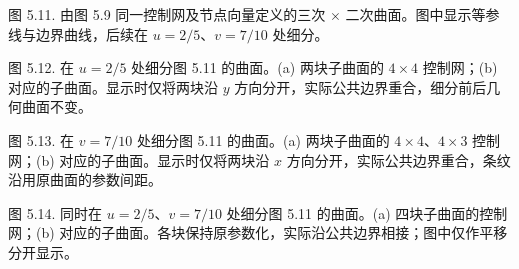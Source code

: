 \documentclass[../main.tex]{subfiles}
\begin{document}
\begin{center}
\begin{minipage}{18cm}
\vspace*{.6\baselineskip}
\centering
{}
\par\smallskip
图 5.11. 由图 5.9 同一控制网及节点向量定义的三次 \(\times\) 二次曲面。图中显示等参线与边界曲线，后续在 \(u=2/5\)、\(v=7/10\) 处细分。
\end{minipage}
\end{center}



\begin{center}
\begin{minipage}{24cm}
\vspace*{.6\baselineskip}
\centering
{}
\par\smallskip
图 5.12. 在 \(u=2/5\) 处细分图 5.11 的曲面。(a) 两块子曲面的 \(4\times4\) 控制网；(b) 对应的子曲面。显示时仅将两块沿 \(y\) 方向分开，实际公共边界重合，细分前后几何曲面不变。
\end{minipage}
\end{center}





\begin{center}
\begin{minipage}{24cm}
\vspace*{.6\baselineskip}
\centering
{}
\par\smallskip
图 5.13. 在 \(v=7/10\) 处细分图 5.11 的曲面。(a) 两块子曲面的 \(4\times4\)、\(4\times3\) 控制网；(b) 对应的子曲面。显示时仅将两块沿 \(x\) 方向分开，实际公共边界重合，条纹沿用原曲面的参数间距。
\end{minipage}
\end{center}



\begin{center}
\begin{minipage}{24.5cm}
\vspace*{.6\baselineskip}
\centering
\begin{minipage}{12cm}
\centering
{}
\end{minipage}\hfill
\begin{minipage}{12cm}
\centering
{}
\end{minipage}
\par\smallskip
图 5.14. 同时在 \(u=2/5\)、\(v=7/10\) 处细分图 5.11 的曲面。(a) 四块子曲面的控制网；(b) 对应的子曲面。各块保持原参数化，实际沿公共边界相接；图中仅作平移分开显示。
\end{minipage}
\end{center}
\end{document}
